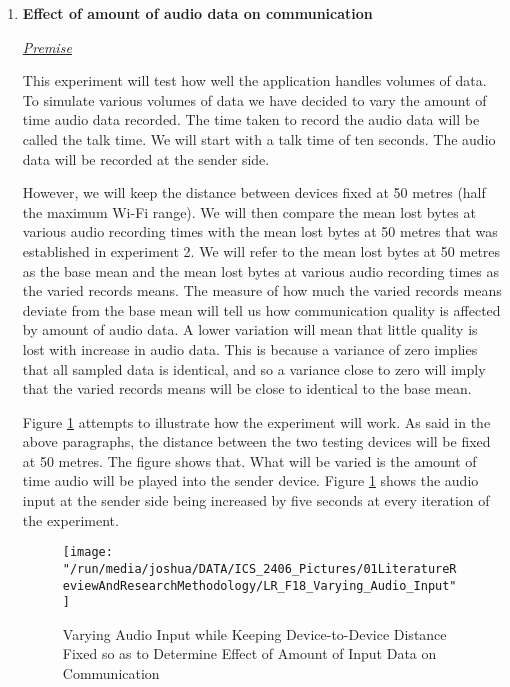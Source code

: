 \documentclass[12pt,svgnames,smaller]{article} %
\begin{document}
\begin{enumerate}
\begin{enumerate}
			
			\item \textbf{Effect of amount of audio data on communication}
			
			\emph{\underline{\textsf{Premise}}}
			
			This experiment will test how well the application handles volumes of data. 
			To simulate various volumes of data we have decided to vary the amount of time audio data recorded. The time taken to record the audio data will be called the talk time. We will start with a talk time of ten seconds. The audio data will be recorded at the sender side. 
			
			However, we will keep the distance between devices fixed at 50 metres (half the maximum Wi-Fi range). We will then compare the mean lost bytes at various audio recording times with the mean lost bytes at 50 metres that was established in experiment 2. We will refer to the mean lost bytes at 50 metres as the base mean and the mean lost bytes at various audio recording times as the varied records means. The measure of how much the varied records means deviate from the base mean will tell us how communication quality is affected by amount of audio data.
			A lower variation will mean that little quality is lost with increase in audio data. This is because a variance of zero implies that all sampled data is identical, and so a variance close to zero will imply that the varied records means will be close to identical to the base mean.
			
			Figure \ref{fig:LiteratureReview-Figure18} attempts to illustrate how the experiment will work. As said in the above paragraphs, the distance between the two testing devices will be fixed at 50 metres. The figure shows that. What will be varied is the amount of time audio will be played into the sender device. Figure \ref{fig:LiteratureReview-Figure18} shows the audio input at the sender side being increased by five seconds at every iteration of the experiment. 

			\begin{figure}
				\centering
				\texttt{[image: "/run/media/joshua/DATA/ICS\_2406\_Pictures/01LiteratureReviewAndResearchMethodology/LR\_F18\_Varying\_Audio\_Input"]}
				\caption{Varying Audio Input while Keeping Device-to-Device Distance Fixed so as to Determine Effect of Amount of Input Data on Communication}
				\label{fig:LiteratureReview-Figure18}
			\end{figure}
						

\end{enumerate}
\end{enumerate}
\end{document}
